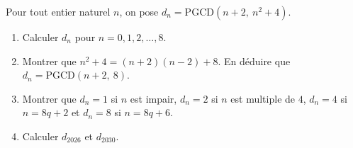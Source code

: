 
Pour tout entier naturel $n$, on pose $d_n=\mathrm{PGCD}(n+2,\ n^2+4)$.
\begin{enumerate}
  \item Calculer $d_n$ pour $n=0,1,2,\dots,8$.
  \item Montrer que $n^2+4=(n+2)(n-2)+8$. En déduire que $d_n=\mathrm{PGCD}(n+2,\ 8)$.
  \item Montrer que $d_n=1$ si $n$ est impair, $d_n=2$ si $n$ est multiple de $4$, $d_n=4$ si $n=8q+2$ et $d_n=8$ si $n=8q+6$.
  \item Calculer $d_{2026}$ et $d_{2030}$.
\end{enumerate}


